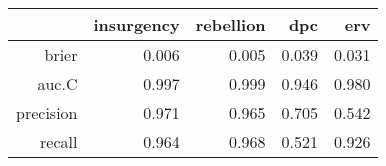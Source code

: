 \begin{tabular}{rrrrr}
  \hline
 & insurgency & rebellion & dpc & erv \\ 
  \hline
brier & 0.006 & 0.005 & 0.039 & 0.031 \\ 
  auc.C & 0.997 & 0.999 & 0.946 & 0.980 \\ 
  precision & 0.971 & 0.965 & 0.705 & 0.542 \\ 
  recall & 0.964 & 0.968 & 0.521 & 0.926 \\ 
   \hline
\end{tabular}
